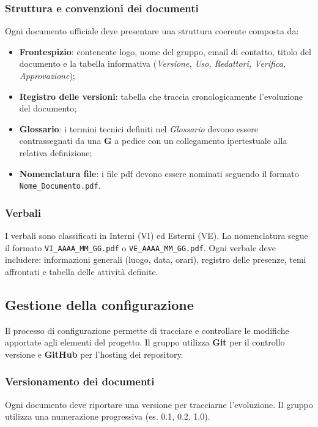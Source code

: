 \documentclass[12pt, a4paper]{article}
\begin{document}
\subsubsection{Struttura e convenzioni dei documenti}
Ogni documento ufficiale deve presentare una struttura coerente composta da:
\begin{itemize}
    \item \textbf{Frontespizio}: contenente logo, nome del gruppo, email di contatto, titolo del documento e la tabella informativa (\textit{Versione, Uso, Redattori, Verifica, Approvazione});
    \item \textbf{Registro delle versioni}: tabella che traccia cronologicamente l'evoluzione del documento;
    \item \textbf{Glossario}: i termini tecnici definiti nel \textit{Glossario} devono essere contrassegnati da una \textbf{G} a pedice con un collegamento ipertestuale alla relativa definizione;
    \item \textbf{Nomenclatura file}: i file pdf devono essere nominati seguendo il formato \texttt{Nome\_Documento.pdf}.
\end{itemize}

\subsubsection{Verbali}
I verbali sono classificati in Interni (VI) ed Esterni (VE). La nomenclatura segue il formato \texttt{VI\_AAAA\_MM\_GG.pdf} o \texttt{VE\_AAAA\_MM\_GG.pdf}. Ogni verbale deve includere: informazioni generali (luogo, data, orari), registro delle presenze, temi affrontati e tabella delle attività definite.

\subsection{Gestione della configurazione}
Il processo di configurazione permette di tracciare e controllare le modifiche apportate agli elementi del progetto. Il gruppo utilizza \textbf{Git} per il controllo versione e \textbf{GitHub} per l'hosting dei repository.

\subsubsection{Versionamento dei documenti}
Ogni documento deve riportare una versione per tracciarne l'evoluzione. Il gruppo utilizza una numerazione progressiva (es. 0.1, 0.2, 1.0).
\end{document}
